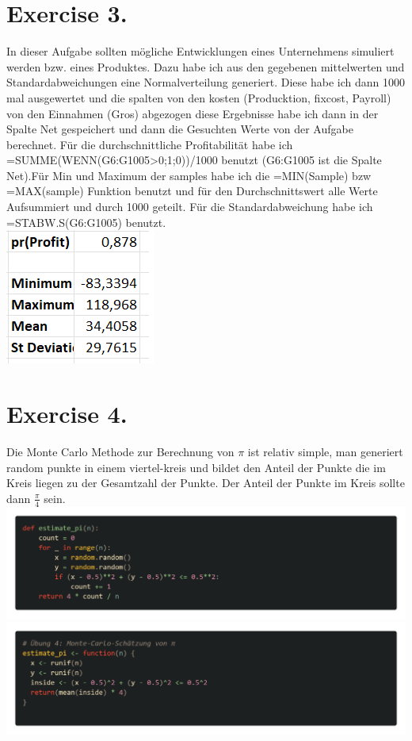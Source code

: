 \documentclass{scrartcl}
\begin{document}
\section*{Exercise 3. }
In dieser Aufgabe sollten mögliche Entwicklungen eines Unternehmens simuliert werden bzw. eines Produktes. Dazu habe ich aus den gegebenen mittelwerten und Standardabweichungen eine Normalverteilung generiert. Diese habe ich dann 1000 mal ausgewertet und die spalten von den kosten (Producktion, fixcost, Payroll) von den Einnahmen (Gros) abgezogen diese Ergebnisse habe ich dann in der Spalte Net gespeichert und dann die Gesuchten Werte von der Aufgabe berechnet. Für die durchschnittliche Profitabilität habe ich =SUMME(WENN(G6:G1005>0;1;0))/1000 benutzt (G6:G1005 ist die Spalte Net).Für Min und Maximum der samples habe ich die =MIN(Sample) bzw =MAX(sample) Funktion benutzt und für den Durchschnittswert alle Werte Aufsummiert und durch 1000 geteilt. Für die Standardabweichung habe ich =STABW.S(G6:G1005) benutzt.\\
\includegraphics*[scale=0.86]{ExelHorror3.png}\\


\section*{Exercise 4.}
Die Monte Carlo Methode zur Berechnung von $\pi$ ist relativ simple, man generiert random punkte in einem viertel-kreis und bildet den Anteil der Punkte die im Kreis liegen zu der Gesamtzahl der Punkte. Der Anteil der Punkte im Kreis sollte dann $\frac{\pi}{4}$ sein.\\
\includegraphics*[scale=0.24]{Monte_Carlo_pi_py.png}\\
\includegraphics*[scale=0.24]{Monte_Carlo_pi_R.png}
\end{document}
